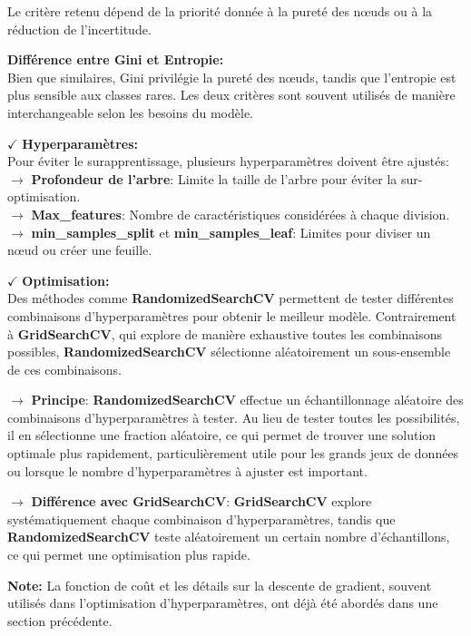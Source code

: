 Le critère retenu dépend de la priorité donnée à la pureté des nœuds ou à la réduction de l'incertitude.

\textbf{Différence entre Gini et Entropie:}\\
Bien que similaires, Gini privilégie la pureté des nœuds, tandis que l’entropie est plus sensible aux classes rares. Les deux critères sont souvent utilisés de manière interchangeable selon les besoins du modèle.

\textbf{\(\checkmark\)} \textbf{Hyperparamètres:}\\
Pour éviter le surapprentissage, plusieurs hyperparamètres doivent être ajustés:\\
\noindent \textbf{\(\rightarrow\)} \textbf{Profondeur de l'arbre}: Limite la taille de l'arbre pour éviter la sur-optimisation.\\
\noindent \textbf{\(\rightarrow\)} \textbf{Max\_features}: Nombre de caractéristiques considérées à chaque division.\\
\noindent \textbf{\(\rightarrow\)} \textbf{min\_samples\_split} et \textbf{min\_samples\_leaf}: Limites pour diviser un nœud ou créer une feuille.

\textbf{\(\checkmark\)} \textbf{Optimisation:}\\
Des méthodes comme \textbf{RandomizedSearchCV} permettent de tester différentes combinaisons d’hyperparamètres pour obtenir le meilleur modèle. Contrairement à \textbf{GridSearchCV}, qui explore de manière exhaustive toutes les combinaisons possibles, \textbf{RandomizedSearchCV} sélectionne aléatoirement un sous-ensemble de ces combinaisons.

\noindent \textbf{\(\rightarrow\)} \textbf{Principe}: \textbf{RandomizedSearchCV} effectue un échantillonnage aléatoire des combinaisons d'hyperparamètres à tester. Au lieu de tester toutes les possibilités, il en sélectionne une fraction aléatoire, ce qui permet de trouver une solution optimale plus rapidement, particulièrement utile pour les grands jeux de données ou lorsque le nombre d'hyperparamètres à ajuster est important.

\noindent \textbf{\(\rightarrow\)} \textbf{Différence avec GridSearchCV}: \textbf{GridSearchCV} explore systématiquement chaque combinaison d’hyperparamètres, tandis que \textbf{RandomizedSearchCV} teste aléatoirement un certain nombre d'échantillons, ce qui permet une optimisation plus rapide.

\textbf{Note:} La fonction de coût et les détails sur la descente de gradient, souvent utilisés dans l’optimisation d’hyperparamètres, ont déjà été abordés dans une section précédente.

